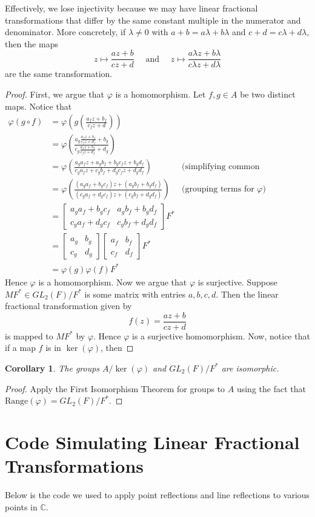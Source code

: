 \documentclass[12pt]{article}
\newcommand{\C}{\mathbb{C}}
\newcommand{\Range}{\text{Range}}
\newcommand{\lftmat}[4]{\begin{bmatrix} {#1} & {#2} \\ {#3} & {#4} \end{bmatrix}}
\theoremstyle{plain}
\newtheorem{corollary}[theorem]{Corollary}
\theoremstyle{definition}
\begin{document}
\begin{appendices}
Effectively, we lose injectivity because we may have linear fractional transformations that differ by the same constant multiple in the numerator and denominator. More concretely, if $\lambda \neq 0$ with $a + b = a\lambda + b\lambda$ and $c + d = c\lambda + d\lambda$, then the maps
\[
	z\mapsto\frac{az + b}{cz + d}\quad\text{ and }\quad z\mapsto\frac{a\lambda z + b\lambda}{c\lambda z + d\lambda}
\]  
are the same transformation.
	
\begin{proof}
	First, we argue that $\varphi$ is a homomorphism. Let $f,g\in A$ be two distinct maps. Notice that
	\begin{align*}
		\varphi(g\circ f) & = \varphi\left(g\left(\frac{a_fz + b_f}{c_fz + d}\right)\right)\\
		& = \varphi\left(\frac{a_g\frac{a_fz + b_f}{c_fz + d_f} + b_g}{c_g\frac{a_fz + b_f}{c_fz + d_f} + d_g}\right)\\
		& = \varphi\left(\frac{a_ga_fz + a_gb_f + b_gc_fz + b_gd_f}{c_ga_fz + c_gb_f + d_gc_fz + d_gd_f}\right) & \text{(simplifying common denominators)}\\
		& = \varphi\left(\frac{(a_ga_f + b_gc_f)z + (a_gb_f + b_gd_f)}{(c_ga_f + d_gc_f)z + (c_gb_f + d_gd_f)}\right) & \text{(grouping terms for $\varphi$)}\\
		& = \lftmat{a_ga_f + b_gc_f}{a_gb_f + b_gd_f}{c_ga_f + d_gc_f}{c_gb_f + d_gd_f} F^*\\
		& = \lftmat{a_g}{b_g}{c_g}{d_g}\lftmat{a_f}{b_f}{c_f}{d_f}F^*\\
		& = \varphi(g)\varphi(f)F^*
	\end{align*}
	Hence $\varphi$ is a homomorphism. Now we argue that $\varphi$ is surjective. Suppose $M F^*\in GL_2(F)/F^*$ is some matrix with entries $a,b,c,d$. Then the linear fractional transformation given by 
	\[
		f(z) = \frac{az + b}{cz + d}
	\]
	is mapped to $M F^*$ by $\varphi$. Hence $\varphi$ is a surjective homomorphism. Now, notice that if a map $f$ is in $\ker(\varphi)$, then 
\end{proof}		
	

\begin{corollary}
	The groups $A/\ker(\varphi)$ and $GL_2(F)/F^*$ are isomorphic.
\end{corollary}
\begin{proof}
	Apply the First Isomorphism Theorem for groups to $A$ using the fact that $\Range(\varphi) = GL_2(F)/F^*$.
\end{proof}

\newpage
\section{Code Simulating Linear Fractional Transformations} \label{appendixD}

Below is the code we used to apply point reflections and line reflections to various points in $\C$. 



\end{appendices}
\end{document}
